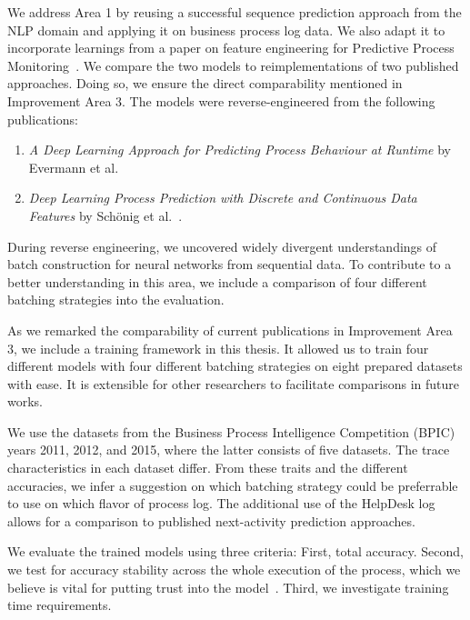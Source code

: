 We address Area 1 by reusing a successful sequence prediction approach from the NLP domain and applying it on business process log data. We also adapt it to incorporate learnings from a paper on feature engineering for Predictive Process Monitoring~\cite{klinkmuller2018reliablemonitoring}. We compare the two models to reimplementations of two published approaches. Doing so, we ensure the direct comparability mentioned in Improvement Area 3. The models were reverse-engineered from the following publications:

\begin{enumerate}
    \item\textit{A Deep Learning Approach for Predicting Process Behaviour at Runtime} by Evermann et al.~\cite{evermann2016}
    \item\textit{Deep Learning Process Prediction with Discrete and Continuous Data Features} by Schönig et al.~\cite{schoenig2018}.
\end{enumerate}

During reverse engineering, we uncovered widely divergent understandings of batch construction for neural networks from sequential data. To contribute to a better understanding in this area, we include a comparison of four different batching strategies into the evaluation.

As we remarked the comparability of current publications in Improvement Area 3, we include a training framework in this thesis. It allowed us to train four different models with four different batching strategies on eight prepared datasets with ease. It is extensible for other researchers to facilitate comparisons in future works.

We use the datasets from the Business Process Intelligence Competition (BPIC) years 2011, 2012, and 2015, where the latter consists of five datasets.
The trace characteristics in each dataset differ.
From these traits and the different accuracies, we infer a suggestion on which batching strategy could be preferrable to use on which flavor of process log.
The additional use of the HelpDesk log allows for a comparison to published next-activity prediction approaches.

We evaluate the trained models using three criteria: First, total accuracy. Second, we test for accuracy stability across the whole execution of the process, which we believe is vital for putting trust into the model~\cite{francescomarino2015, boehmer2018probability}. Third, we investigate training time requirements.

